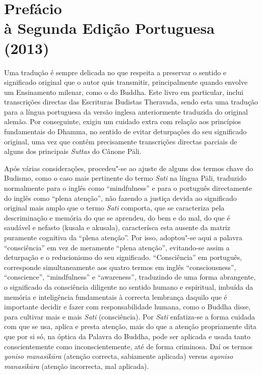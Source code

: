 \chapter[Prefácio à Segunda Edição Portuguesa (2013)]{Prefácio\\ à Segunda Edição Portuguesa\\ (2013)}

Uma tradução é sempre delicada no que respeita a preservar o sentido e
significado original que o autor quis transmitir, principalmente quando envolve
um Ensinamento milenar, como o do Buddha. Este livro em particular, inclui
transcrições directas das Escrituras Budistas Theravada, sendo esta uma tradução
para a língua portuguesa da versão inglesa anteriormente traduzida do original
alemão. Por conseguinte, exigiu um cuidado extra com relação aos princípios
fundamentais do Dhamma, no sentido de evitar deturpações do seu significado
original, uma vez que contém precisamente transcrições directas parciais de
alguns dos principais \emph{Suttas} do Cânone Pāli.

Após várias considerações, procedeu"-se ao ajuste de alguns dos termos chave do
Budismo, como o caso mais pertinente do termo \emph{Sati} na língua Pāli,
traduzido normalmente para o inglês como “mindfulness” e para o português
directamente do inglês como “plena atenção”, não fazendo a justiça devida ao
significado original mais amplo que o termo \emph{Sati} comporta, que se caracteriza
pela descriminação e memória do que se aprendeu, do bem e do mal, do que é saudável e
nefasto (kusala e akusala), caracterísca esta ausente da matriz puramente cognitiva da 
“plena atenção”. Por isso, adoptou"-se aqui a palavra “consciência” em vez de meramente
“plena atenção”, evitando-se assim a deturpação e o reducionismo do seu significado. 
“Consciência” em português, corresponde simultaneamente aos quatro termos em inglês
“consciousness”, “conscience”, “mindfulness” e “awareness”, traduzindo de uma forma 
abrangente, o significado da consciência diligente no sentido humano e espiritual, 
imbuída da memória e inteligência fundamentais à correcta lembrança daquilo que é 
importante decidir e fazer com responsabilidade humana, como o Buddha disse, para
cultivar mais e mais \emph{Sati} (consciência). Por \emph{Sati} enfatiza-se a forma
cuidada com que se usa, aplica e presta atenção, mais do que a atenção propriamente
dita que por si só, na óptica da Palavra do Buddha, pode ser aplicada e usada tanto 
conscientemente como inconscientemente, até de forma criminosa. Daí os termos 
\emph{yoniso manasikāra} (atenção correcta, sabiamente aplicada) 
versus \emph{ayoniso manasikāra} (atenção incorrecta, mal aplicada).

